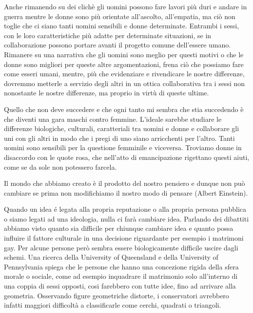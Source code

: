 \documentclass[12pt]{book} %
\begin{document}
\begin{mdframed}[linewidth=1pt]
\bigskip

Anche rimanendo su dei clichè gli uomini possono fare lavori più duri e andare in guerra mentre le donne sono più
orientate all'ascolto, all'empatia, ma ciò non toglie che ci siano tanti
uomini sensibili e donne determinate. Entrambi i sessi, con le loro caratteristiche più adatte per determinate
situazioni, se in collaborazione possono portare avanti il progetto comune dell'essere umano.
Rimanere su una narrativa che gli uomini sono meglio per questi motivi o che le donne sono migliori per queste altre
argomentazioni, frena ciò che possiamo fare come esseri umani, mentre, più che evidenziare e rivendicare le nostre
differenze, dovremmo metterle a servizio degli altri in un ottica collaborativa tra i sessi non nonostante le nostre
differenze, ma proprio in virtù di queste ultime. 

Quello che non deve succedere e che ogni tanto mi sembra che stia succedendo è che diventi una gara maschi contro
femmine. L'ideale sarebbe studiare le differenze biologiche, culturali, caratteriali tra uomini e
donne e collaborare gli uni con gli altri in modo che i pregi di uno siano arricchenti per
l'altro. Tanti uomini sono sensibili per la questione femminile e viceversa. Troviamo donne in
disaccordo con le quote rosa, che nell'atto di emancipazione rigettano questi aiuti, come se da
sole non potessero farcela.
\end{mdframed}

\bigskip

Il mondo che abbiamo creato è il prodotto del nostro pensiero e dunque non può cambiare se prima non modifichiamo il
nostro modo di pensare (Albert Einstein).


\bigskip

Quando un idea é legata alla propria reputazione o alla propria persona pubblica o siamo legati ad una ideologia, nulla ci farà cambiare idea. 
Parlando dei dibattiti abbiamo visto quanto sia difficile per chiunque cambiare idea e quanto possa influire il fattore
culturale in una decisione riguardante per esempio i matrimoni gay. Per alcune persone però sembra essere
biologicamente difficile uscire dagli schemi. Una ricerca della University of Queensland e della University of
Pennsylvania spiega
che le persone che hanno una concezione rigida della sfera morale o sociale, come ad esempio inquadrare il matrimonio
solo all'interno di una coppia di sessi opposti, cosi farebbero con tutte idee, fino ad arrivare alla geometria.
Osservando figure geometriche distorte, i conservatori avrebbero infatti maggiori difficoltà a classificarle come
cerchi, quadrati o triangoli.
\end{document}
